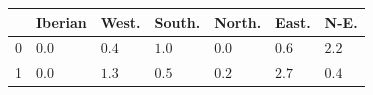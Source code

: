 \begin{tabular}{l}
\toprule
 & Iberian & West. & South. & North. & East. & N-E. \\
 & ${0.0}$ & ${0.4}$ & ${1.0}$ & ${0.0}$ & ${0.6}$ & $\mathbf{2.2}$ \\
1 & ${0.0}$ & ${1.3}$ & ${0.5}$ & $\mathbf{0.2}$ & $\mathbf{2.7}$ & $\mathbf{0.4}$ \\
\bottomrule
\end{tabular}
